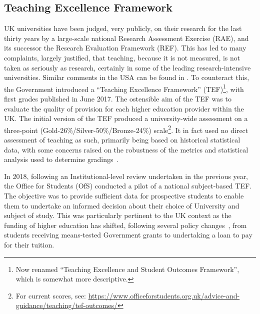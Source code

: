 \documentclass[conference]{IEEEtran}
\begin{document}
\subsection{Teaching Excellence Framework}

UK universities have been judged, very publicly, on their research for
the last thirty years by a large-scale national Research Assessment
Exercise (RAE), and its successor the Research Evaluation Framework
(REF). This has led to many complaints, largely justified, that
teaching, because it is not measured, is not taken as seriously as
research, certainly in some of the leading research-intensive
universities. Similar comments in the USA can be found in
\cite{Campbelletal2018a}. To counteract this, the Government
introduced a ``Teaching Excellence Framework'' (TEF)\footnote{Now
renamed ``Teaching Excellence and Student Outcomes Framework'', which
is somewhat more descriptive.}, with first grades published in June
2017. The ostensible aim of the TEF was to evaluate the quality of
provision for each higher education provider within the UK. The
initial version of the TEF produced a university-wide assessment on a
three-point (Gold-26\%/Silver-50\%/Bronze-24\%) scale\footnote{For
current scores, see:
\url{https://www.officeforstudents.org.uk/advice-and-guidance/teaching/tef-outcomes/}}. It
in fact used no direct assessment of teaching as such, primarily being
based on historical statistical data, with some concerns raised on the
robustness of the metrics and statistical analysis used to determine
gradings~\cite{gillard:2017}.

In 2018, following an Institutional-level review undertaken in the
previous year, the Office for Students (OfS) conducted a pilot of a
national subject-based TEF. The objective was to provide sufficient
data for prospective students to enable them to undertake an informed
decision about their choice of University and subject of study. This
was particularly pertinent to the UK context as the funding of higher
education has shifted, following several policy
changes~\cite{BIS2010a}, from students receiving means-tested
Government grants to undertaking a loan to pay for their tuition.
\end{document}
